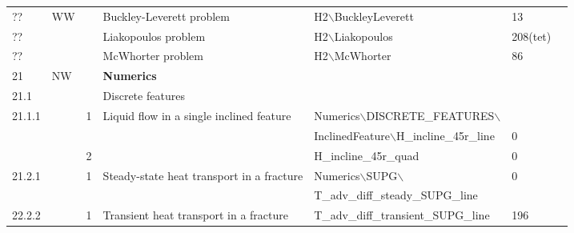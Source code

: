 \begin{landscape}
\begin{center}
\begin{tabularx}{\linewidth}{lllXXll}
??&WW&&         Buckley-Leverett problem&       H2$\backslash$BuckleyLeverett&13&\\
??&&&Liakopoulos problem&       H2$\backslash$Liakopoulos&208(tet)&\\
??&&&McWhorter problem& H2$\backslash$McWhorter&86&\\   

\midrule
21&NW&& \textbf{Numerics}&&&\\
21.1&&& Discrete features&&&\\
21.1.1          &&1& Liquid flow in a single inclined feature                           &Numerics$\backslash$DISCRETE\_FEATURES$\backslash$&&\\
&&&&InclinedFeature$\backslash$H\_incline\_45r\_line&0&\\
                                        &&2&&H\_incline\_45r\_quad&0&\\
21.2.1          &&1& Steady-state heat transport in a fracture &Numerics$\backslash$SUPG$\backslash$&0&\\
&&&&T\_adv\_diff\_steady\_SUPG\_line&&\\
22.2.2          &&1 & Transient heat transport in a fracture  &T\_adv\_diff\_transient\_SUPG\_line&196&\\
\bottomrule
                                                         
\end{tabularx}
\end{center}
\end{landscape}

%